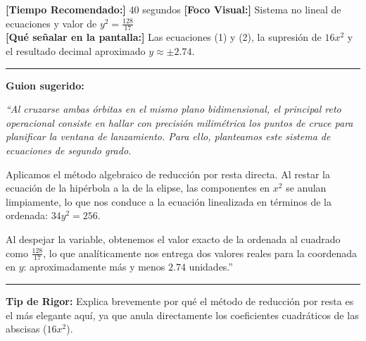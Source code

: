 \documentclass[12pt,letterpaper]{article}
\begin{document}
\begin{tcolorbox}[colframe=USSBlue, colback=white, title=\textbf{DIAPOSITIVA 25: Intersección Analítica de Órbitas (Pág. 25)}, coltitle=white]
    \small
    \textbf{[Tiempo Recomendado:]} 40 segundos \hfill \textbf{[Foco Visual:]} Sistema no lineal de ecuaciones y valor de $y^2 = \frac{128}{17}$ \\
    \textbf{[Qué señalar en la pantalla:]} Las ecuaciones (1) y (2), la supresión de $16x^2$ y el resultado decimal aproximado $y \approx \pm 2.74$.
    \hrule\vspace{0.2cm}
    \textbf{Guion sugerido:}
    \medskip
    
    {\itshape
    ``Al cruzarse ambas órbitas en el mismo plano bidimensional, el principal reto operacional consiste en hallar con precisión milimétrica los puntos de cruce para planificar la ventana de lanzamiento. Para ello, planteamos este sistema de ecuaciones de segundo grado.
    
    Aplicamos el método algebraico de reducción por resta directa. Al restar la ecuación de la hipérbola a la de la elipse, las componentes en $x^2$ se anulan limpiamente, lo que nos conduce a la ecuación linealizada en términos de la ordenada: $34y^2 = 256$.
    
    Al despejar la variable, obtenemos el valor exacto de la ordenada al cuadrado como $\frac{128}{17}$, lo que analíticamente nos entrega dos valores reales para la coordenada en $y$: aproximadamente más y menos $2.74$ unidades.''}
    \vspace{0.2cm}\hrule\vspace{0.15cm}
    \textbf{Tip de Rigor:} Explica brevemente por qué el método de reducción por resta es el más elegante aquí, ya que anula directamente los coeficientes cuadráticos de las abscisas ($16x^2$).
\end{tcolorbox}

\newpage
\end{document}
